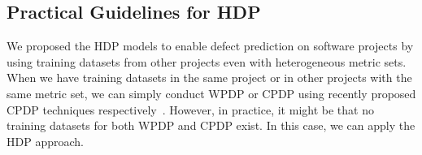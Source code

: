 % 
% 






\subsection{Practical Guidelines for HDP}

We proposed the HDP models to enable defect prediction on software projects
by using training datasets from other projects even with heterogeneous metric sets.
When we have training datasets in the same project or in other
projects with the same metric set, we can simply conduct
WPDP or CPDP using recently proposed CPDP techniques
respectively~\cite{Canfora13,Ma12,Nam13,Panichella14,Ryu14,Ryu15}.
However, in practice, it might be that no training datasets for
both WPDP and CPDP exist. In this case, we can apply the HDP approach.

